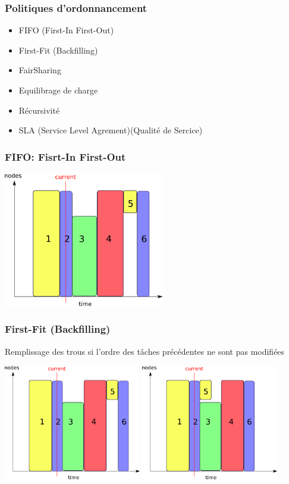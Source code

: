 \documentclass{beamer}
\begin{document}
\begin{frame}
	\frametitle{Politiques d'ordonnancement}
		\begin{itemize}
		\item FIFO (First-In First-Out)
		\item First-Fit (Backfilling)
		\item FairSharing
    \item Equilibrage de charge
    \item Récursivité
		\item SLA (Service Level Agrement)(Qualité de Sercice)
	\end{itemize}

\end{frame}

\begin{frame}
	\frametitle{FIFO: Fisrt-In First-Out}
	\begin{center}
		\includegraphics[width=7cm]{fifo.png}
	\end{center}

\end{frame}

\begin{frame}
	\frametitle{ First-Fit (Backfilling)}
	Remplissage des trous si l'ordre des tâches précédentes ne sont pas modifiées
	\begin{center}
			\includegraphics[width=6cm]{fifo.png}
		\includegraphics[width=6cm]{cbf.png}
	\end{center}

\end{frame}
\end{document}
